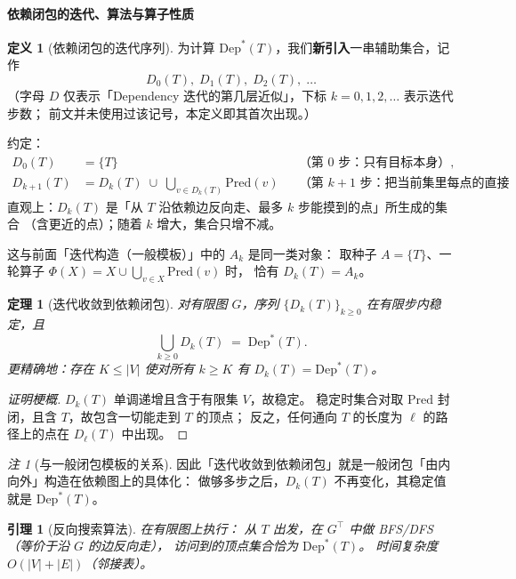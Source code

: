 \documentclass[UTF8,a4paper,11pt]{ctexart}
\theoremstyle{definition}
\newtheorem{definition}{定义}[section]
\theoremstyle{plain}
\newtheorem{theorem}{定理}[section]
\newtheorem{lemma}{引理}[section]
\theoremstyle{remark}
\newtheorem{remark}{注}[section]
\numberwithin{figure}{section}
\numberwithin{table}{section}
\begin{document}
\paragraph{依赖闭包的迭代、算法与算子性质}

\begin{definition}[依赖闭包的迭代序列]
为计算 $\mathrm{Dep}^*(T)$，我们\textbf{新引入}一串辅助集合，记作
\[
D_0(T),\; D_1(T),\; D_2(T),\; \ldots
\]
（字母 $D$ 仅表示「Dependency 迭代的第几层近似」，下标 $k=0,1,2,\ldots$ 表示迭代步数；
前文并未使用过该记号，本定义即其首次出现。）

约定：
\begin{align*}
D_0(T) &= \{T\}
&& \text{（第 $0$ 步：只有目标本身）}, \\
D_{k+1}(T) &= D_k(T) \;\cup\; \bigcup_{v\in D_k(T)}\mathrm{Pred}(v)
&& \text{（第 $k{+}1$ 步：把当前集里每点的直接前驱都并进来）}.
\end{align*}
直观上：$D_k(T)$ 是「从 $T$ 沿依赖边反向走、最多 $k$ 步能摸到的点」所生成的集合
（含更近的点）；随着 $k$ 增大，集合只增不减。

这与前面「迭代构造（一般模板）」中的 $A_k$ 是同一类对象：
取种子 $A=\{T\}$、一轮算子 $\Phi(X)=X\cup\bigcup_{v\in X}\mathrm{Pred}(v)$ 时，
恰有 $D_k(T)=A_k$。
\end{definition}

\begin{theorem}[迭代收敛到依赖闭包]
对有限图 $G$，序列 $\{D_k(T)\}_{k\ge 0}$ 在有限步内稳定，且
\[
\bigcup_{k\ge 0} D_k(T) \;=\; \mathrm{Dep}^*(T).
\]
更精确地：存在 $K\le |V|$ 使对所有 $k\ge K$ 有 $D_k(T)=\mathrm{Dep}^*(T)$。
\end{theorem}
\begin{proof}[证明梗概]
$D_k(T)$ 单调递增且含于有限集 $V$，故稳定。
稳定时集合对取 $\mathrm{Pred}$ 封闭，且含 $T$，故包含一切能走到 $T$ 的顶点；
反之，任何通向 $T$ 的长度为 $\ell$ 的路径上的点在 $D_\ell(T)$ 中出现。
\end{proof}

\begin{remark}[与一般闭包模板的关系]
因此「迭代收敛到依赖闭包」就是一般闭包「由内向外」构造在依赖图上的具体化：
做够多步之后，$D_k(T)$ 不再变化，其稳定值就是 $\mathrm{Dep}^*(T)$。
\end{remark}

\begin{lemma}[反向搜索算法]
在有限图上执行：
从 $T$ 出发，在 $G^{\top}$ 中做 BFS/DFS（等价于沿 $G$ 的边反向走），
访问到的顶点集合恰为 $\mathrm{Dep}^*(T)$。
时间复杂度 $O(|V|+|E|)$（邻接表）。
\end{lemma}
\end{document}
